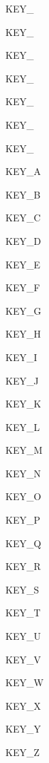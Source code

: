  KEY\_ \par
 KEY\_ \par
 KEY\_ \par
 KEY\_ \par
 KEY\_ \par
 KEY\_ \par
 KEY\_ \par
 \par
 KEY\_\-A \par
 KEY\_\-B \par
 KEY\_\-C \par
 KEY\_\-D \par
 KEY\_\-E \par
 KEY\_\-F \par
 KEY\_\-G \par
 KEY\_\-H \par
 KEY\_\-I \par
 KEY\_\-J \par
 KEY\_\-K \par
 KEY\_\-L \par
 KEY\_\-M \par
 KEY\_\-N \par
 KEY\_\-O \par
 KEY\_\-P \par
 KEY\_\-Q \par
 KEY\_\-R \par
 KEY\_\-S \par
 KEY\_\-T \par
 KEY\_\-U \par
 KEY\_\-V \par
 KEY\_\-W \par
 KEY\_\-X \par
 KEY\_\-Y \par
 KEY\_\-Z \par


